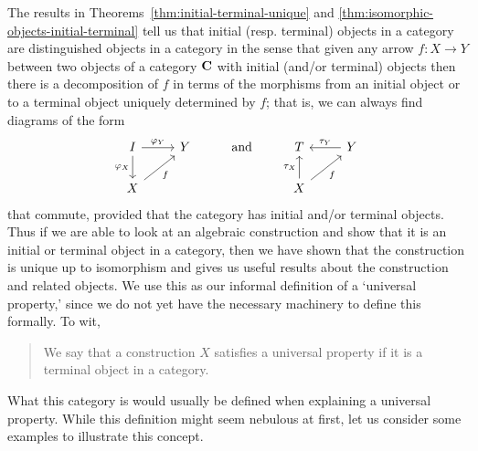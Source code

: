 The results in Theorems~\ref{thm:initial-terminal-unique} and
\ref{thm:isomorphic-objects-initial-terminal} tell us that initial (resp.
terminal) objects in a category are distinguished objects in a category in the
sense that given any arrow \(f : X \to Y\) between two objects of a category
\(\mathbf{C}\) with initial (and/or terminal) objects then there is a
decomposition of \(f\) in terms of the morphisms from an initial object or to a
terminal object uniquely determined by \(f\); that is, we can always find
diagrams of the form
\[
    \begin{tikzcd}
        I \arrow[d, "\phi_X"'] \arrow[r, "\phi_Y"] & Y &  \text{and} & T                                      & Y \arrow[l, "\tau_Y"'] \\
        X \arrow[ru, "f"']                         &   &   & X \arrow[u, "\tau_X"] \arrow[ru, "f"'] &                       
        \end{tikzcd}
\]
that commute, provided that the category has initial and/or terminal objects.
Thus if we are able to look at an algebraic construction and show that it is an
initial or terminal object in a category, then we have shown that the
construction is unique up to isomorphism and gives us useful results about the
construction and related objects. We use this as our informal definition of a
`universal property,' since we do not yet have the necessary machinery to define
this formally. To wit,
\begin{quotation}
    We say that a construction \(X\) satisfies a universal property if it is a
    terminal object in a category.
\end{quotation}
What this category is would usually be defined when explaining a universal
property. While this definition might seem nebulous at first, let us consider
some examples to illustrate this concept.

